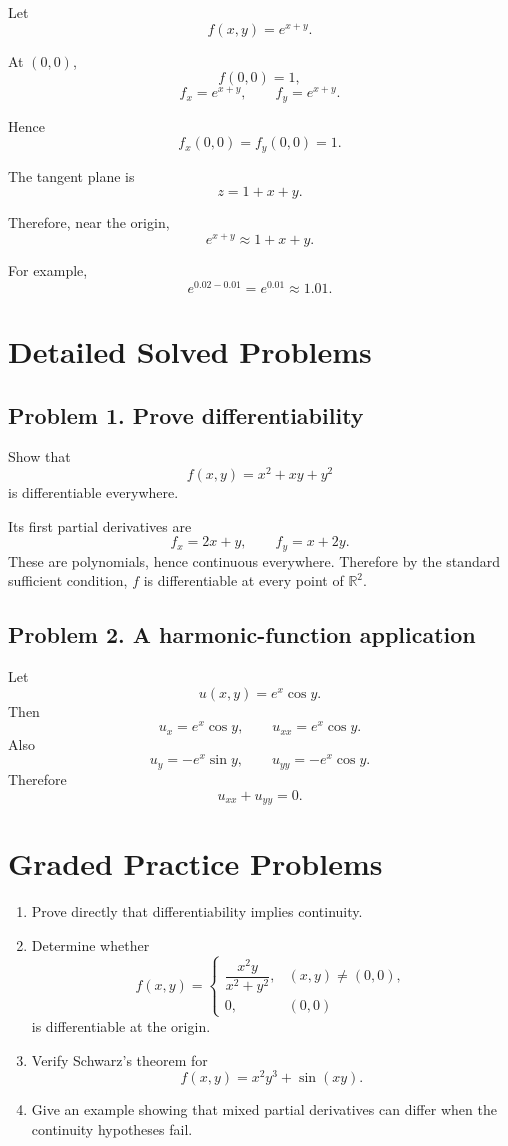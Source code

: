 \documentclass[11pt,oneside]{book}
\theoremstyle{studentthm}
\theoremstyle{definition}
\newcommand{\R}{\mathbb{R}}
\begin{document}
Let
\[
f(x,y)=e^{x+y}.
\]

At \((0,0)\),
\[
f(0,0)=1,
\]
\[
f_x=e^{x+y},
\qquad
f_y=e^{x+y}.
\]

Hence
\[
f_x(0,0)=f_y(0,0)=1.
\]

The tangent plane is
\[
z=1+x+y.
\]

Therefore, near the origin,
\[
e^{x+y}\approx1+x+y.
\]

For example,
\[
e^{0.02-0.01}
=
e^{0.01}
\approx
1.01.
\]


\section{Detailed Solved Problems}

\subsection*{Problem 1. Prove differentiability}
Show that
\[
f(x,y)=x^2+xy+y^2
\]
is differentiable everywhere.

Its first partial derivatives are
\[
f_x=2x+y,
\qquad
f_y=x+2y.
\]
These are polynomials, hence continuous everywhere. Therefore by the
standard sufficient condition, \(f\) is differentiable at every
point of \(\R^2\).

\subsection*{Problem 2. A harmonic-function application}
Let
\[
u(x,y)=e^x\cos y.
\]
Then
\[
u_x=e^x\cos y,
\qquad
u_{xx}=e^x\cos y.
\]
Also
\[
u_y=-e^x\sin y,
\qquad
u_{yy}=-e^x\cos y.
\]
Therefore
\[
u_{xx}+u_{yy}=0.
\]

\section{Graded Practice Problems}
\begin{enumerate}
\item Prove directly that differentiability implies continuity.
\item Determine whether
\[
f(x,y)=
\begin{cases}
\dfrac{x^2y}{x^2+y^2},&(x,y)\ne(0,0),\\
0,&(0,0)
\end{cases}
\]
is differentiable at the origin.
\item Verify Schwarz's theorem for
\[
f(x,y)=x^2y^3+\sin(xy).
\]
\item Give an example showing that mixed partial derivatives can
differ when the continuity hypotheses fail.
\end{enumerate}
\end{document}
